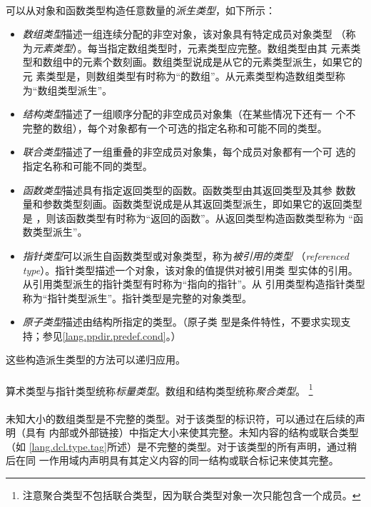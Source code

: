 {\paragraph{}
可以从对象和函数类型构造任意数量的\textit{派生类型}，如下所示：
\begin{itemize}
  \item{\textit{数组类型}描述一组连续分配的非空对象，该对象具有特定成员对象类型
    （称为\textit{元素类型}）。每当指定数组类型时，元素类型应完整。数组类型由其
    元素类型和数组中的元素个数刻画。数组类型说成是从它的元素类型派生，如果它的元
    素类型是，则数组类型有时称为``的数组''。从元素类型构造数组类型称
    为``数组类型派生''。}
  \item{\textit{结构类型}描述了一组顺序分配的非空成员对象集（在某些情况下还有一
    个不完整的数组），每个对象都有一个可选的指定名称和可能不同的类型。}
  \item{\textit{联合类型}描述了一组重叠的非空成员对象集，每个成员对象都有一个可
    选的指定名称和可能不同的类型。}
  \item{\textit{函数类型}描述具有指定返回类型的函数。函数类型由其返回类型及其参
    数数量和参数类型刻画。函数类型说成是从其返回类型派生，即如果它的返回类型是
    ，则该函数类型有时称为``返回的函数''。从返回类型构造函数类型称为
    ``函数类型派生''。}
  \item{\textit{指针类型}可以派生自函数类型或对象类型，称为\textit{被引用的类型}
    （\textit{referenced type}）。指针类型描述一个对象，该对象的值提供对被引用类
    型实体的引用。从引用类型派生的指针类型有时称为``指向的指针''。从
    引用类型构造指针类型称为``指针类型派生''。指针类型是完整的对象类型。}
  \item{\textit{原子类型}描述由结构所指定的类型。（原子类
    型是条件特性，不要求实现支持；参见\ref{lang.ppdir.predef.cond}。）}
\end{itemize}
这些构造派生类型的方法可以递归应用。

\paragraph{}
算术类型与指针类型统称\textit{标量类型}。数组和结构类型统称\textit{聚合类型}。
\footnote{注意聚合类型不包括联合类型，因为联合类型对象一次只能包含一个成员。}

\paragraph{}
未知大小的数组类型是不完整的类型。对于该类型的标识符，可以通过在后续的声明（具有
内部或外部链接）中指定大小来使其完整。未知内容的结构或联合类型（如
\ref{lang.dcl.type.tag}所述）是不完整的类型。对于该类型的所有声明，通过稍后在同
一作用域内声明具有其定义内容的同一结构或联合标记来使其完整。

}
